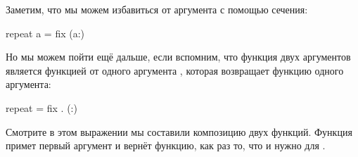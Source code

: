 \begin{itemize}
    Заметим, что мы можем избавиться от аргумента  
    с помощью сечения:

\begin{code}
repeat a = fix (a:)
\end{code}   

    Но мы можем пойти ещё дальше, если вспомним, что 
    функция двух аргументов \In{(:)} является 
    функцией от одного аргумента \mbox{,}
    которая возвращает функцию одного аргумента:

\begin{code}
repeat = fix . (:)
\end{code}   

    Смотрите в этом выражении мы составили композицию двух
    функций. Функция \In{(:)} примет первый аргумент и вернёт
    функцию, как раз то, что и нужно для .


\end{itemize}



